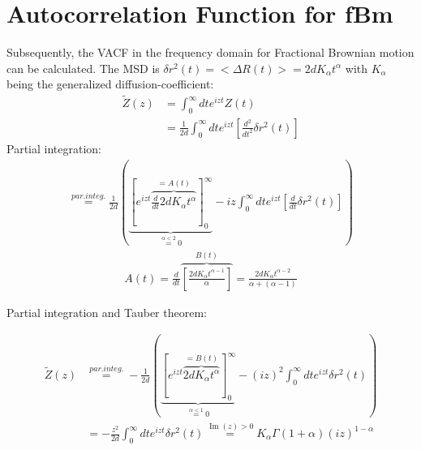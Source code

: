 \documentclass[
  a4paper,BCOR10mm,oneside,
  headsepline,footsepline,%
  fleqn,openbib
]{scrbook}
\begin{document}
\section{Autocorrelation Function for fBm}\label{VACF}
Subsequently, the VACF in the frequency domain for Fractional Brownian motion can be calculated. The MSD is $\delta r^{2}(t)= < \Delta R(t)>=2dK_{\alpha}t^{\alpha}$ with $K_{\alpha}$ being the generalized diffusion-coefficient:
\begin{align*}
 \tilde{Z}(z)&=\int_{0}^{\infty} d t e^{izt} Z(t) \\
 &=\frac{1}{2 d} \int_{0}^{\infty} d t e^{izt} \left[\frac{d^2}{dt^2}\delta r^2 (t) \right]
\end{align*}
Partial integration:
\begin{align*}
  \stackrel{par. integ.}{=} \frac{1}{2 d} \left( \underbrace{\left [ e^{izt}\overbrace{ \frac{d}{dt} 2dK_{\alpha}t^{\alpha}}^{=A(t)} \right]_{0}^{\infty}}_{\stackrel{\alpha < 2} {=} 0}- i z \int_{0}^{\infty} d t e^{izt} \left[\frac{d}{dt}\delta r^2 (t)\right] \right) 
 \end{align*}
 \begin{align*}
 A(t)=\frac{d}{dt}\overbrace{ \left [\frac{2d K_{\alpha}t^{\alpha-1}}{\alpha} \right ]}^{B(t)}=\frac{2d K_{\alpha}t^{\alpha-2}}{\alpha+(\alpha-1)}
\end{align*}

Partial integration and Tauber theorem:

\begin{align*}
 \tilde{Z}(z) & \stackrel{par. integ.}{=} - \frac{1}{2 d} \left( \underbrace{\left [ e^{izt}\overbrace{  2dK_{\alpha}t^{\alpha}}^{=B(t)} \right]_{0}^{\infty}}_{\stackrel{\alpha < 1} {=} 0} - (iz)^2 \int_{0}^{\infty} d t e^{izt} \delta r^2 (t) \right) \\
  & = - \frac{z^2}{2 d}\int_{0}^{\infty} d t e^{izt} \delta r^2 (t)  \stackrel{\operatorname{Im}(z)> 0} {=}  K_{\alpha} \Gamma(1+\alpha)(i z)^{1-\alpha} 
\end{align*}
\end{document}
